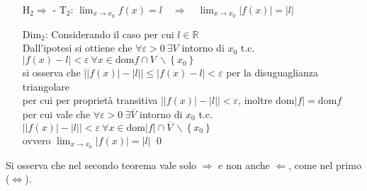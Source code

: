 \documentclass[a4paper]{article}
\newcommand\dom{\text{dom}}
\begin{document}
\begin{itemize}
	\item[H\(_2 \Rightarrow\) - T\(_2\): ] \(\displaystyle \lim_{x \to x_0} f(x) = l \quad \Rightarrow \quad \lim_{x \to x_0} \left| f(x) \right| = \left| l \right|\)
	\item[Dim\(_2\): ] Considerando il caso per cui \(l \in \mathbb{R}\) \\
	Dall'ipotesi si ottiene che \(\forall \varepsilon > 0 \  \exists V\) intorno di \(x_0\) t.c. \(\left| f(x) - l \right| < \varepsilon \  \forall x \in \dom f \cap V \  \backslash \left\{ x_0 \right\}\) \\
	si osserva che \(\left| \left| f(x) \right| - \left| l \right| \right| \leq \left| f(x) - l \right| < \varepsilon\) per la disuguaglianza triangolare \\
	per cui per proprietà transitiva \(\left| \left| f(x) \right| - \left| l \right| \right| < \varepsilon\), inoltre \(\dom \left| f \right| = \dom f\)\\
	per cui vale che \( \forall \varepsilon > 0 \  \exists \overline{V}\) intorno di \(x_0\) t.c. \(\left| \left| f(x) \right| - \left| l \right| \right| < \varepsilon \  \forall x \in \dom \left| f \right| \cap \overline{V} \  \backslash \left\{ x_0 \right\}\) \\
	ovvero \(\displaystyle \lim_{x \to x_0} \left| f(x) \right| = \left| l \right|\) \qed
\end{itemize}
Si osserva che nel secondo teorema vale solo \(\Rightarrow\) e non anche \(\Leftarrow\), come nel primo (\(\Leftrightarrow\)). 
\newpage
\end{document}

